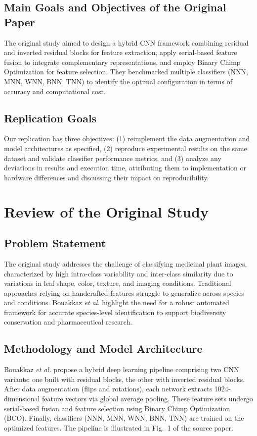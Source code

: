 \documentclass[journal,onecolumn]{IEEEtran}
\begin{document}
\subsection{Main Goals and Objectives of the Original Paper}
The original study aimed to design a hybrid CNN framework combining residual and inverted residual blocks for feature extraction, apply serial-based feature fusion to integrate complementary representations, and employ Binary Chimp Optimization for feature selection. They benchmarked multiple classifiers (NNN, MNN, WNN, BNN, TNN) to identify the optimal configuration in terms of accuracy and computational cost.

\subsection{Replication Goals}
Our replication has three objectives: (1) reimplement the data augmentation and model architectures as specified, (2) reproduce experimental results on the same dataset and validate classifier performance metrics, and (3) analyze any deviations in results and execution time, attributing them to implementation or hardware differences and discussing their impact on reproducibility.

\section{Review of the Original Study}
\subsection{Problem Statement}
The original study addresses the challenge of classifying medicinal plant images, characterized by high intra-class variability and inter-class similarity due to variations in leaf shape, color, texture, and imaging conditions. Traditional approaches relying on handcrafted features struggle to generalize across species and conditions. Bouakkaz \textit{et al.} highlight the need for a robust automated framework for accurate species-level identification to support biodiversity conservation and pharmaceutical research.

\subsection{Methodology and Model Architecture}
Bouakkaz \textit{et al.} propose a hybrid deep learning pipeline comprising two CNN variants: one built with residual blocks, the other with inverted residual blocks. After data augmentation (flips and rotations), each network extracts 1024-dimensional feature vectors via global average pooling. These feature sets undergo serial-based fusion and feature selection using Binary Chimp Optimization (BCO). Finally, classifiers (NNN, MNN, WNN, BNN, TNN) are trained on the optimized features. The pipeline is illustrated in Fig.~1 of the source paper.
\end{document}
